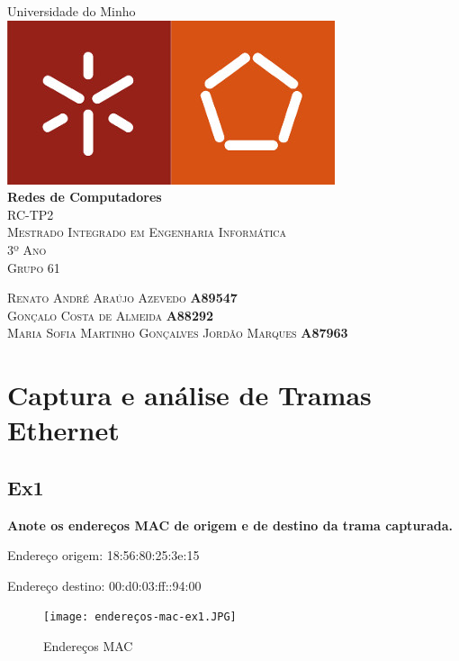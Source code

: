 \documentclass{article}
\begin{document}
\begin{capa}
	\begin{center}
	\vspace*{1.0cm}
	\huge{Universidade do Minho}\\
	[1.0cm]
	\includegraphics{logo.jpg}\\
	[1.5cm]
	\huge{\textbf{Redes de Computadores}}\\
	[0.5cm]
	\textsc{RC-TP2}\\
	\textsc{\normalsize{Mestrado Integrado em Engenharia Informática}}\\
	\textsc{\normalsize{3º Ano}}\\
	\textsc{\normalsize{Grupo 61}}\\
	[12.0cm]
	\end{center}
	\begin{flushleft}
	\textsc{Renato André Araújo Azevedo \textbf{\hspace*{130pt} A89547}}\\
	\textsc{Gonçalo Costa de Almeida \textbf{\hspace*{151pt} A88292}}\\
	\textsc{Maria Sofia Martinho Gonçalves Jordão Marques \textbf{\hspace*{30pt} A87963}}\\
	\end{flushleft}
\end{capa}

\newpage
\tableofcontents
\newpage

\section{Captura e análise de Tramas Ethernet}
\subsection{Ex1}
\textbf{Anote os endereços MAC de origem e de destino da trama capturada.}\\\par
Endereço origem: 18:56:80:25:3e:15\par
Endereço destino: 00:d0:03:ff::94:00
\begin{figure}[h]
	\centering
	\texttt{[image: endereços-mac-ex1.JPG]}
	\caption{Endereços MAC}
\end{figure}
\end{document}
